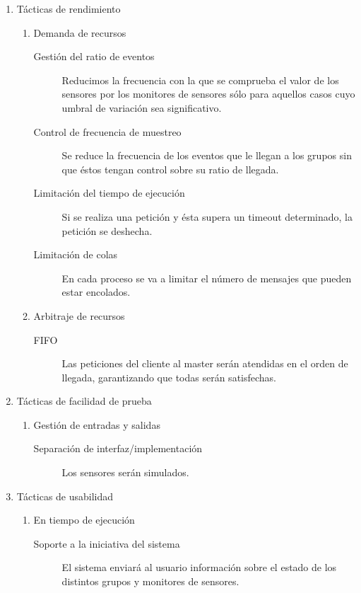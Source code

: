 \documentclass[a4paper,10pt]{article}
\begin{document}
\begin{enumerate}
  \item Tácticas de rendimiento
  \begin{enumerate}
    \item Demanda de recursos
    \begin{description}
      \item [Gestión del ratio de eventos] Reducimos la frecuencia con la que se 
comprueba el valor de los sensores por los monitores de sensores sólo para 
aquellos casos cuyo umbral de variación sea significativo.
      \item [Control de frecuencia de muestreo] Se reduce la frecuencia de 
los eventos que le llegan a los grupos sin que éstos tengan control sobre su 
ratio de llegada.
      \item [Limitación del tiempo de ejecución] Si se realiza una petición y 
ésta supera un timeout determinado, la petición se deshecha.
      \item [Limitación de colas] En cada proceso se va a limitar el número de 
mensajes que pueden estar encolados.
    \end{description}
    \item Arbitraje de recursos
    \begin{description}
      \item [FIFO] Las peticiones del cliente al master serán atendidas en el 
orden de llegada, garantizando que todas serán satisfechas.
    \end{description}
  \end{enumerate}  
  
  \item Tácticas de facilidad de prueba
  \begin{enumerate}
    \item Gestión de entradas y salidas
    \begin{description}
      \item [Separación de interfaz/implementación] Los sensores serán 
simulados.
    \end{description}
  \end{enumerate}
  
  \item Tácticas de usabilidad
  \begin{enumerate}
    \item En tiempo de ejecución
    \begin{description}
      \item [Soporte a la iniciativa del sistema] El sistema enviará al 
usua\-rio información sobre el estado de los distintos grupos y monitores de sensores.
    \end{description}
  \end{enumerate}
\end{enumerate}
  
\end{document}
